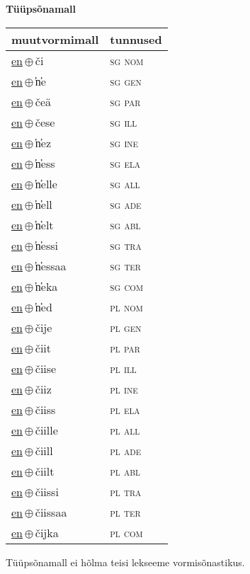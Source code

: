 

\vspace{3.5em}
\noindent \begin{minipage}{\textwidth}
\noindent \textbf{Tüüpsõnamall \,}\\

\begin{sideways}
\begin{tabular}{l l}
muutvormimall & tunnused \\
\hline
\underline{en}\,$\oplus$\,či & \textsc{ sg nom } \\
\underline{en}\,$\oplus$\,̕n̕e & \textsc{ sg gen } \\
\underline{en}\,$\oplus$\,čeä & \textsc{ sg par } \\
\underline{en}\,$\oplus$\,čese & \textsc{ sg ill } \\
\underline{en}\,$\oplus$\,̕n̕ez & \textsc{ sg ine } \\
\underline{en}\,$\oplus$\,̕n̕ess & \textsc{ sg ela } \\
\underline{en}\,$\oplus$\,̕n̕elle & \textsc{ sg all } \\
\underline{en}\,$\oplus$\,̕n̕ell & \textsc{ sg ade } \\
\underline{en}\,$\oplus$\,̕n̕elt & \textsc{ sg abl } \\
\underline{en}\,$\oplus$\,̕n̕essi & \textsc{ sg tra } \\
\underline{en}\,$\oplus$\,̕n̕essaa & \textsc{ sg ter } \\
\underline{en}\,$\oplus$\,̕n̕eka & \textsc{ sg com } \\
\underline{en}\,$\oplus$\,̕n̕ed & \textsc{ pl nom } \\
\underline{en}\,$\oplus$\,čije & \textsc{ pl gen } \\
\underline{en}\,$\oplus$\,čiit & \textsc{ pl par } \\
\underline{en}\,$\oplus$\,čiise & \textsc{ pl ill } \\
\underline{en}\,$\oplus$\,čiiz & \textsc{ pl ine } \\
\underline{en}\,$\oplus$\,čiiss & \textsc{ pl ela } \\
\underline{en}\,$\oplus$\,čiille & \textsc{ pl all } \\
\underline{en}\,$\oplus$\,čiill & \textsc{ pl ade } \\
\underline{en}\,$\oplus$\,čiilt & \textsc{ pl abl } \\
\underline{en}\,$\oplus$\,čiissi & \textsc{ pl tra } \\
\underline{en}\,$\oplus$\,čiissaa & \textsc{ pl ter } \\
\underline{en}\,$\oplus$\,čijka & \textsc{ pl com } \\
\end{tabular}
\end{sideways}
\label{tab:tüüpsõnamall-enči}

\end{minipage}

 
\vspace{1em}
\noindent Tüüpsõnamall  ei hõlma teisi lekseeme vormi\-sõnastikus.
